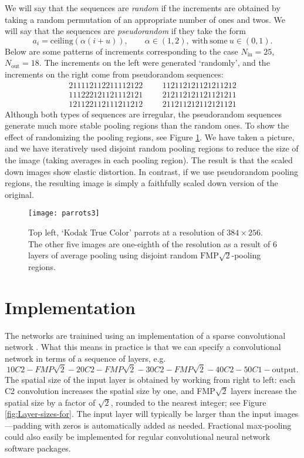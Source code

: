 \documentclass[english]{article}
\begin{document}
We will say that the sequences are \emph{random} if the increments
are obtained by taking a random permutation of an appropriate number
of ones and twos. We will say that the sequences are \emph{pseudorandom}
if they take the form
\[
a_{i}=\mathrm{ceiling}(\alpha(i+u)),\qquad\alpha\in(1,2),\ \mathrm{with}\ \mathrm{some}\ u\in(0,1).
\]
 Below are some patterns of increments corresponding to the case $N_{\mathrm{in}}=25$,
$N_{\mathrm{out}}=18$. The increments on the left were generated\emph{
}`randomly', and the increments on the right come from pseudorandom
sequences:
\[
\begin{array}{cccc}
211112112211112122 &  &  & 112112121121211212\\
111222121121112121 &  &  & 212112121121121211\\
121122112111211212 &  &  & 211211212112121121
\end{array}
\]
Although both types of sequences are irregular, the pseudorandom sequences
generate much more stable pooling regions than the random ones. To
show the effect of randomizing the pooling regions, see Figure \ref{fig:parrots}.
We have taken a picture, and we have iteratively used disjoint random
pooling regions to reduce the size of the image (taking averages in
each pooling region). The result is that the scaled down images show
elastic distortion. In contrast, if we use pseudorandom pooling regions,
the resulting image is simply a faithfully scaled down version of
the original.

\begin{figure}
\begin{centering}
\texttt{[image: parrots3]}
\par\end{centering}

\caption{Top left, `Kodak True Color' parrots at a resolution of $384\times256$.
The other five images are one-eighth of the resolution as a result
of 6 layers of average pooling using disjoint random $\mathrm{FMP}\sqrt{2}$-pooling
regions. \label{fig:parrots}}
\end{figure}



\section{Implementation\label{sec:Implementation}}

The networks are trainined using an implementation of a  sparse convolutional network \cite{GrahamSparse}.
What this means in practice is
that we can specify a convolutional network in terms of a sequence
of layers, e.g.
\[
10C2-FMP\sqrt{2}-20C2-FMP\sqrt{2}-30C2-FMP\sqrt{2}-40C2-50C1-\mathrm{output}.
\]
The spatial size of the input layer is obtained by working from right
to left: each C2 convolution increases the spatial size by one, and
FMP$\sqrt{2}$ layers increase the spatial size by a factor of $\sqrt{2}$,
rounded to the nearest integer; see Figure \ref{fig:Layer-sizes-for}.
The input layer will typically be larger than the input images---padding
with zeros is automatically added as needed. Fractional max-pooling
could also easily be implemented for regular convolutional neural
network software packages.
\end{document}
